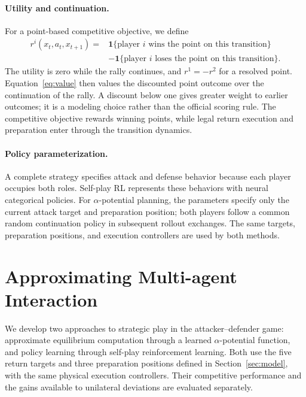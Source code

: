 \documentclass[pmlr]{jmlr}
\newcommand{\ind}{\mathbf{1}}
\begin{document}
\paragraph{Utility and continuation.}
For a point-based competitive objective, we define
\begin{equation}
\begin{aligned}
  r^i(x_t,a_t,x_{t+1})={}&
  \ind\{\text{player }i\text{ wins the point on this transition}\}\\
  &-\ind\{\text{player }i\text{ loses the point on this transition}\}.
\end{aligned}
  \label{eq:reward}
\end{equation}
The utility is zero while the rally continues, and $r^1=-r^2$ for a resolved point. Equation~\eqref{eq:value} then values the discounted point outcome over the continuation of the rally. A discount below one gives greater weight to earlier outcomes; it is a modeling choice rather than the official scoring rule. The competitive objective rewards winning points, while legal return execution and preparation enter through the transition dynamics.

\paragraph{Policy parameterization.}
\label{sec:policy_param}
A complete strategy specifies attack and defense behavior because each player occupies both roles. Self-play RL represents these behaviors with neural categorical policies. For $\alpha$-potential planning, the parameters specify only the current attack target and preparation position; both players follow a common random continuation policy in subsequent rollout exchanges. The same targets, preparation positions, and execution controllers are used by both methods.

\section{Approximating Multi-agent Interaction}
\label{sec:approximation}

We develop two approaches to strategic play in the attacker--defender game: approximate equilibrium computation through a learned $\alpha$-potential function, and policy learning through self-play reinforcement learning. Both use the five return targets and three preparation positions defined in Section~\ref{sec:model}, with the same physical execution controllers. Their competitive performance and the gains available to unilateral deviations are evaluated separately.
\end{document}
